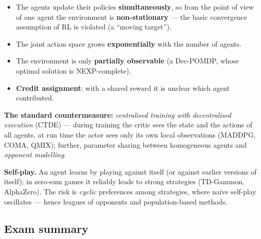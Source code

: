 \documentclass[11pt,a4paper]{article}
\theoremstyle{definition}
\providecommand{\uv}[1]{``#1''}
\begin{document}
\begin{defbox}
\begin{itemize}
\item The agents update their policies \textbf{simultaneously}, so from the point of view of one
  agent the environment is \textbf{non-stationary} --- the basic convergence assumption of RL is
  violated (a \uv{moving target}).
\item The joint action space grows \textbf{exponentially} with the number of agents.
\item The environment is only \textbf{partially observable} (a Dec-POMDP, whose optimal solution
  is NEXP-complete).
\item \textbf{Credit assignment}: with a shared reward it is unclear which agent contributed.
\end{itemize}
\textbf{The standard countermeasure:} \emph{centralised training with decentralised execution}
(CTDE) --- during training the critic sees the state and the actions of all agents, at run time
the actor sees only its own local observations (MADDPG, COMA, QMIX); further, parameter sharing
between homogeneous agents and \emph{opponent modelling}.
\end{defbox}

\textbf{Self-play.} An agent learns by playing against itself (or against earlier versions of
itself); in zero-sum games it reliably leads to strong strategies (TD-Gammon, AlphaZero).
The risk is \emph{cyclic} preferences among strategies, where naive self-play oscillates ---
hence leagues of opponents and population-based methods.

\subsection{Exam summary}
\end{document}
